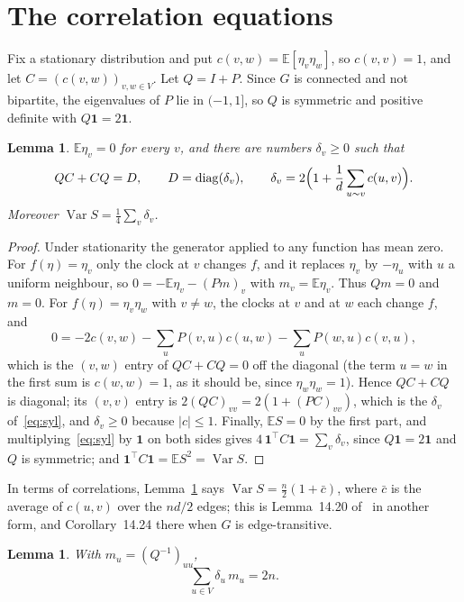 \documentclass[11pt]{amsart}
\newtheorem{lemma}[theorem]{Lemma}
\theoremstyle{remark}
\numberwithin{equation}{section}
\newcommand{\E}{\mathbb{E}}
\newcommand{\one}{\mathbf{1}}
\DeclareMathOperator{\Var}{Var}
\begin{document}
\section{The correlation equations}

Fix a stationary distribution and put $c(v,w)=\E[\eta_v\eta_w]$, so $c(v,v)=1$, and let $C=(c(v,w))_{v,w\in V}$. Let
$Q=I+P$. Since $G$ is connected and not bipartite, the eigenvalues of $P$ lie in $(-1,1]$, so $Q$ is symmetric and
positive definite with $Q\one=2\one$.

\begin{lemma}\label{lem:eq}
$\E\eta_v=0$ for every $v$, and there are numbers $\delta_v\ge0$ such that
\begin{equation}\label{eq:syl}
QC+CQ=D,\qquad D=\operatorname{diag}(\delta_v),\qquad \delta_v=2\Bigl(1+\frac1d\sum_{u\sim v}c(u,v)\Bigr).
\end{equation}
Moreover $\Var S=\tfrac14\sum_v\delta_v$.
\end{lemma}

\begin{proof}
Under stationarity the generator applied to any function has mean zero. For $f(\eta)=\eta_v$ only the clock at $v$
changes $f$, and it replaces $\eta_v$ by $-\eta_u$ with $u$ a uniform neighbour, so $0=-\E\eta_v-(Pm)_v$ with
$m_v=\E\eta_v$. Thus $Qm=0$ and $m=0$. For $f(\eta)=\eta_v\eta_w$ with $v\ne w$, the clocks at $v$ and at $w$ each change
$f$, and
\[
0=-2c(v,w)-\sum_{u}P(v,u)c(u,w)-\sum_{u}P(w,u)c(v,u),
\]
which is the $(v,w)$ entry of $QC+CQ=0$ off the diagonal (the term $u=w$ in the first sum is $c(w,w)=1$, as it should
be, since $\eta_w\eta_w=1$). Hence $QC+CQ$ is diagonal; its $(v,v)$ entry is $2(QC)_{vv}=2(1+(PC)_{vv})$, which is the
$\delta_v$ of~\eqref{eq:syl}, and $\delta_v\ge0$ because $|c|\le1$. Finally, $\E S=0$ by the first part, and
multiplying~\eqref{eq:syl} by $\one$ on both sides gives $4\,\one^{\top}C\one=\sum_v\delta_v$, since $Q\one=2\one$ and
$Q$ is symmetric; and $\one^{\top}C\one=\E S^2=\Var S$.
\end{proof}

In terms of correlations, Lemma~\ref{lem:eq} says $\Var S=\frac n2(1+\bar c)$, where $\bar c$ is the average of
$c(u,v)$ over the $nd/2$ edges; this is Lemma~14.20 of~\cite{AF} in another form, and Corollary~14.24 there when $G$ is
edge-transitive.

\begin{lemma}\label{lem:rep}
With $m_u=(Q^{-1})_{uu}$,
\[
\sum_{u\in V}\delta_u\,m_u=2n.
\]
\end{lemma}
\end{document}
